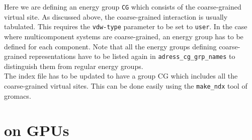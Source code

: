 Here we are defining an energy group {\tt CG} which consists of the coarse-grained virtual site.
As discussed above, the coarse-grained interaction is usually tabulated. This requires the {\tt vdw-type} parameter to be set to {\tt user}. In the case where multicomponent systems are coarse-grained, an energy group has to be defined for each component. Note that all the energy groups defining coarse-grained representations have to be listed again in {\tt adress_cg_grp_names} to distinguish them from regular energy groups.\\
The index file has to be updated to have a group CG which includes all the coarse-grained virtual sites. This can be done easily using the {\tt make_ndx} tool of gromacs.

\section{{\gromacs} on GPUs}

